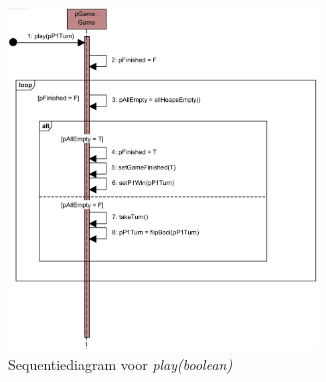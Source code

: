 \begin{landscape}
	\newpage
	\thispagestyle{empty}
	\begin{figure}
		\vspace*{-2cm}
		\begin{subfigure}{\textwidth}
			\includegraphics[width=0.9\textwidth]{chap-evaluatie/play.png}
			\caption{Sequentiediagram voor \textit{play(boolean)}}
			\label{fig:nim-play}
		\end{subfigure}%
		\begin{subfigure}{\textwidth}

\end{subfigure}
\end{figure}
\end{landscape}
